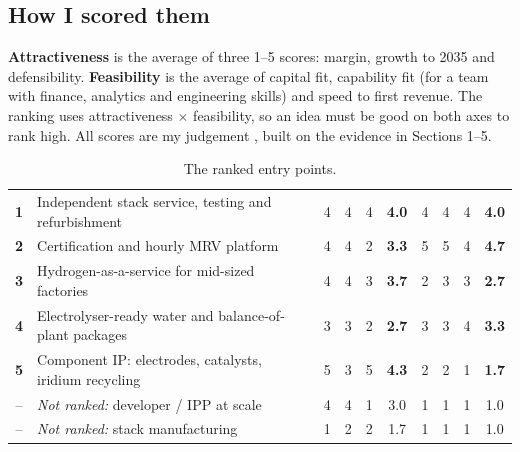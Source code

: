 \newpage
{}\label{sec:entry}

\subsection{How I scored them}

\textbf{Attractiveness} is the average of three 1–5 scores: margin, growth to 2035 and defensibility. \textbf{Feasibility} is the average of capital fit, capability fit (for a team with finance, analytics and engineering skills) and speed to first revenue. The ranking uses attractiveness $\times$ feasibility, so an idea must be good on both axes to rank high. All scores are my judgement \estd, built on the evidence in Sections 1–5.

\begin{table}[H]\centering\tablefont
\caption{The ranked entry points.}
\begin{tabularx}{\textwidth}{@{}c L c c c c c c c c@{}}
\toprule
{} &  &  &  &  &  &  &  &  & \\ \midrule
\textbf{1} & Independent stack service, testing and refurbishment & 4 & 4 & 4 & \textbf{4.0} & 4 & 4 & 4 & \textbf{4.0}\\
\textbf{2} & Certification and hourly MRV platform & 4 & 4 & 2 & \textbf{3.3} & 5 & 5 & 4 & \textbf{4.7}\\
\textbf{3} & Hydrogen-as-a-service for mid-sized factories & 4 & 4 & 3 & \textbf{3.7} & 2 & 3 & 3 & \textbf{2.7}\\
\textbf{4} & Electrolyser-ready water and balance-of-plant packages & 3 & 3 & 2 & \textbf{2.7} & 3 & 3 & 4 & \textbf{3.3}\\
\textbf{5} & Component IP: electrodes, catalysts, iridium recycling & 5 & 3 & 5 & \textbf{4.3} & 2 & 2 & 1 & \textbf{1.7}\\ \midrule
-- & \emph{Not ranked:} developer / IPP at scale & 4 & 4 & 1 & 3.0 & 1 & 1 & 1 & 1.0\\
-- & \emph{Not ranked:} stack manufacturing & 1 & 2 & 2 & 1.7 & 1 & 1 & 1 & 1.0\\
\bottomrule
\end{tabularx}
\end{table}

